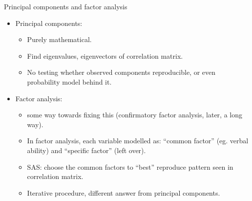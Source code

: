 \documentclass[pdf]{prosper}
\begin{document}
\begin{slide}{Principal components and factor analysis}

  \begin{itemize}
  \item Principal components: 
    \begin{itemize}
    \item Purely mathematical.
    \item Find eigenvalues, eigenvectors of correlation matrix.
    \item No testing whether observed components reproducible, or even probability model behind it.
    \end{itemize}
  \item Factor analysis: 
    \begin{itemize}
    \item some way towards fixing this (confirmatory factor analysis, later, a long way).
    \item In factor analysis, each variable modelled as: ``common factor'' (eg. verbal ability) and ``specific factor'' (left over).
    \item SAS: choose the common factors to ``best'' reproduce pattern seen in correlation matrix.
    \item Iterative procedure, different answer from principal components.
    \end{itemize}

  \end{itemize}

\end{slide}
\end{document}

